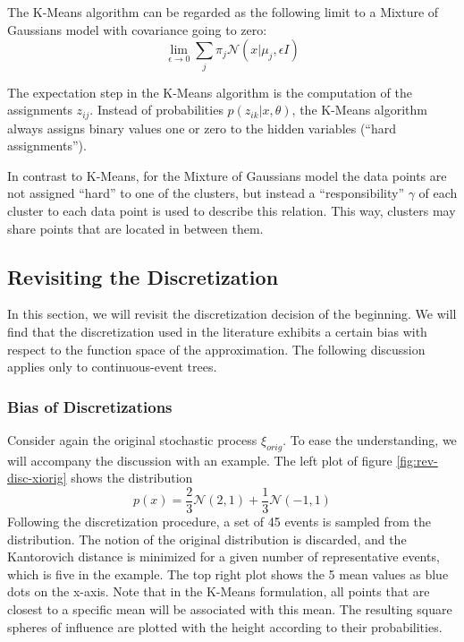 The K-Means algorithm can be regarded as the following limit to a Mixture of Gaussians model with covariance going to zero:
\begin{equation}
  \label{eq:23}
  \lim\limits_{\epsilon\rightarrow 0}\sum_j\pi_j\mathcal{N}(x| \mu_j,\epsilon I)
\end{equation}

The expectation step in the K-Means algorithm is the computation of the assignments $z_{ij}$. Instead of probabilities $p(z_{ik}|x,\theta)$, the K-Means algorithm always assigns binary values one or zero to the hidden variables (``hard assignments'').

In contrast to K-Means, for the Mixture of Gaussians model the data points are not assigned ``hard'' to one of the clusters, but instead a ``responsibility'' $\gamma$ of each cluster to each data point is used to describe this relation. This way, clusters may share points that are located in between them.
\subsection{Revisiting the Discretization}
\label{sec:revisiting-discretization}
In this section, we will revisit the discretization decision of the beginning.
We will find that the discretization used in the literature exhibits a certain bias with respect to the function space of the approximation. The following discussion applies only to continuous-event trees.
\subsubsection{Bias of Discretizations}
Consider again the original stochastic process $\xi_{orig}$. To ease the understanding, we will accompany the discussion with an example. The left plot of figure \ref{fig:rev-disc-xiorig} shows the distribution
\begin{equation}
  \label{eq:24}
  p(x) = \frac{2}{3}\mathcal{N}(2,1) + \frac{1}{3}\mathcal{N}(-1,1)
\end{equation}
 Following the discretization procedure, a set of 45 events is sampled from the distribution.
 The notion of the original distribution is discarded, and the Kantorovich distance is minimized for a given number of representative events, which is five in the example.
 The top right plot shows the 5 mean values as blue dots on the x-axis.
 Note that in the K-Means formulation, all points that are closest to a specific mean will be associated with this mean.
 The resulting square spheres of influence are plotted with the height according to their probabilities.


